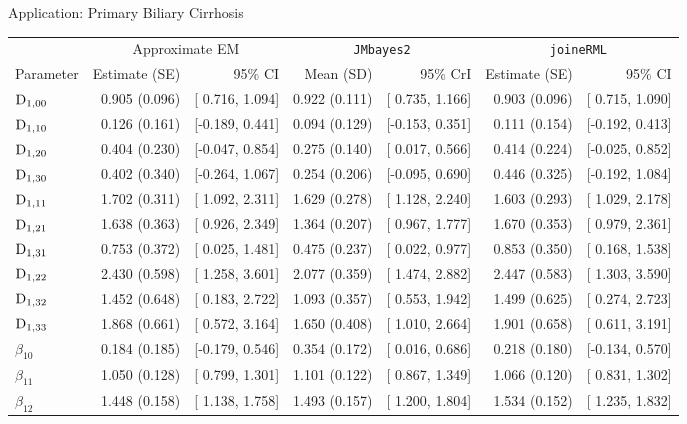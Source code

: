 \begin{chapter}{\label{cha:app-PBC}Application: Primary Biliary Cirrhosis}
  \begin{table}[ht]
  \centering
  \captionsetup{font=scriptsize}
  \begingroup\scriptsize
  \setlength{\tabcolsep}{3pt} %
  \begin{tabular}{lrrrrrr}
    & \multicolumn{2}{c}{Approximate EM} & \multicolumn{2}{c}{\tt{JMbayes2}} & \multicolumn{2}{c}{\tt{joineRML}}\\
    Parameter & Estimate (SE) & 95\% CI & Mean (SD) & 95\% CrI & Estimate (SE) & 95\% CI\\
    \hline
    $\mathrm{D}_{1,00}$ & 0.905 (0.096) & [ 0.716, 1.094] & 0.922 (0.111) & [ 0.735, 1.166] & 0.903 (0.096) & [ 0.715, 1.090] \\ 
    $\mathrm{D}_{1,10}$ & 0.126 (0.161) & [-0.189, 0.441] & 0.094 (0.129) & [-0.153, 0.351] & 0.111 (0.154) & [-0.192, 0.413] \\ 
    $\mathrm{D}_{1,20}$ & 0.404 (0.230) & [-0.047, 0.854] & 0.275 (0.140) & [ 0.017, 0.566] & 0.414 (0.224) & [-0.025, 0.852] \\ 
    $\mathrm{D}_{1,30}$ & 0.402 (0.340) & [-0.264, 1.067] & 0.254 (0.206) & [-0.095, 0.690] & 0.446 (0.325) & [-0.192, 1.084] \\ 
    $\mathrm{D}_{1,11}$ & 1.702 (0.311) & [ 1.092, 2.311] & 1.629 (0.278) & [ 1.128, 2.240] & 1.603 (0.293) & [ 1.029, 2.178] \\ 
    $\mathrm{D}_{1,21}$ & 1.638 (0.363) & [ 0.926, 2.349] & 1.364 (0.207) & [ 0.967, 1.777] & 1.670 (0.353) & [ 0.979, 2.361] \\ 
    $\mathrm{D}_{1,31}$ & 0.753 (0.372) & [ 0.025, 1.481] & 0.475 (0.237) & [ 0.022, 0.977] & 0.853 (0.350) & [ 0.168, 1.538] \\ 
    $\mathrm{D}_{1,22}$ & 2.430 (0.598) & [ 1.258, 3.601] & 2.077 (0.359) & [ 1.474, 2.882] & 2.447 (0.583) & [ 1.303, 3.590] \\ 
    $\mathrm{D}_{1,32}$ & 1.452 (0.648) & [ 0.183, 2.722] & 1.093 (0.357) & [ 0.553, 1.942] & 1.499 (0.625) & [ 0.274, 2.723] \\ 
    $\mathrm{D}_{1,33}$ & 1.868 (0.661) & [ 0.572, 3.164] & 1.650 (0.408) & [ 1.010, 2.664] & 1.901 (0.658) & [ 0.611, 3.191] \\ 
    $\beta_{10}$ &  0.184 (0.185) & [-0.179, 0.546] &  0.354 (0.172) & [ 0.016, 0.686] &  0.218 (0.180) & [-0.134, 0.570] \\ 
    $\beta_{11}$ &  1.050 (0.128) & [ 0.799, 1.301] &  1.101 (0.122) & [ 0.867, 1.349] &  1.066 (0.120) & [ 0.831, 1.302] \\ 
    $\beta_{12}$ &  1.448 (0.158) & [ 1.138, 1.758] &  1.493 (0.157) & [ 1.200, 1.804] &  1.534 (0.152) & [ 1.235, 1.832] \\ 

\end{tabular}
\end{table}
\end{chapter}
